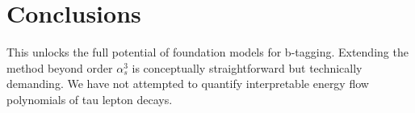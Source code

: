 \section{Conclusions}\label{sec:conclusions}

This unlocks the full potential of foundation models for b-tagging.
Extending the method beyond order $\alpha_s^3$ is conceptually
straightforward but technically demanding. We have not attempted to
quantify interpretable energy flow polynomials of tau lepton decays.

